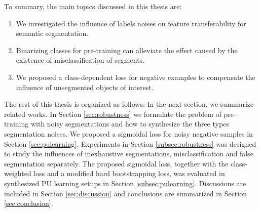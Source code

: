 
To summary, the main topics discussed in this thesis are:
\begin{enumerate}
  \item We investigated the influence of labels noises on feature transferability for semantic segmentation.
  \item Binarizing classes for pre-training can alleviate the effect caused by the existence of misclassification of segments.
  \item We proposed a class-dependent loss for negative examples to compensate the influence of unsegmented objects of interest.
\end{enumerate}




The rest of this thesis is organized as follows:
In the next section, we summarize related works.
In Section \ref{sec:robustness} we formulate the problem of pre-training with noisy segmentations and how to synthesize the three types segmentation noises.
We proposed a sigmoidal loss for noisy negative samples in Section \ref{sec:pulearning}.
Experiments in Section \ref{subsec:robustness} was designed to study the influences of inexhaustive segmentations, misclassification and false segmentation separately.
The proposed sigmoidal loss, together with the class-weighted loss and a modified hard bootstrapping loss, was evaluated in synthesized PU learning setups in Section \ref{subsec:pulearning}.
Discussions are included in Section \ref{sec:discussion} and conclusions are summarized in Section \ref{sec:conclusion}.
